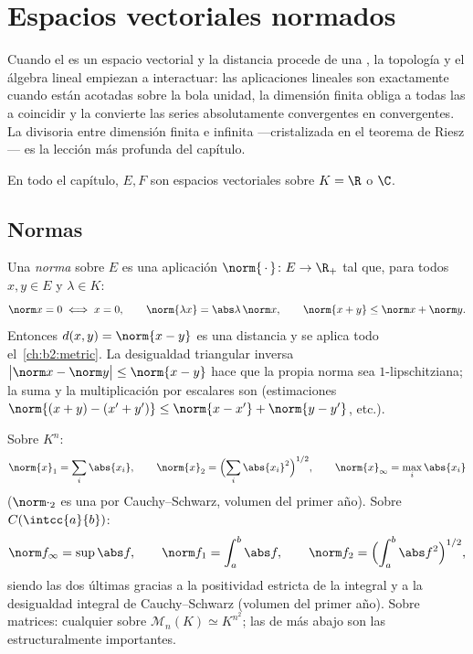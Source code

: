 \chapter{Espacios vectoriales normados}\label{ch:b2:nvs}

Cuando el  es un espacio vectorial y la distancia
procede de una , la topología y el álgebra lineal empiezan a
interactuar: las aplicaciones lineales son  exactamente
cuando están acotadas sobre la bola unidad, la dimensión finita obliga
a todas las  a coincidir y la  convierte las series
absolutamente convergentes en convergentes. La divisoria entre
dimensión finita e infinita ---cristalizada en el teorema de Riesz---
es la lección más profunda del capítulo.

En todo el capítulo, $E, F$ son espacios vectoriales sobre $K = \R$ o
$\C$.

\section{Normas}

\begin{definition}\label{def:b2:nvs:norm}
Una \emph{norma} sobre $E$ es una aplicación
$\norm{\,\cdot\,} \colon E \to \R_+$ tal que, para todos $x, y \in
E$ y $\lambda \in K$:
\[
\norm x = 0 \iff x = 0,
\qquad
\norm{\lambda x} = \abs\lambda\,\norm x,
\qquad
\norm{x + y} \leq \norm x + \norm y .
\]
Entonces $d(x, y) = \norm{x - y}$ es una distancia y se aplica todo
el~\cref{ch:b2:metric}. La desigualdad triangular inversa
$\bigl|\norm x - \norm y\bigr| \leq \norm{x - y}$ hace que la propia
norma sea $1$-lipschitziana; la suma y la multiplicación por
escalares son  (estimaciones $\norm{(x + y) - (x' + y')}
\leq \norm{x - x'} + \norm{y - y'}$, etc.).
\end{definition}

\begin{example}\label{ex:b2:nvs:examples}
Sobre $K^n$:
\[
\norm{x}_1 = \sum_i \abs{x_i},
\qquad
\norm{x}_2 = \Bigl(\sum_i \abs{x_i}^2\Bigr)^{1/2},
\qquad
\norm{x}_\infty = \max_i \abs{x_i}
\]
($\norm\cdot_2$ es una  por Cauchy--Schwarz, volumen del primer
año). Sobre $C(\intcc{a}{b})$:
\[
\norm f_\infty = \sup \abs f,
\qquad
\norm f_1 = \int_a^b \abs f,
\qquad
\norm f_2 = \Bigl(\int_a^b \abs f^2\Bigr)^{1/2},
\]
siendo las dos últimas  gracias a la positividad estricta de
la integral y a la desigualdad integral de Cauchy--Schwarz (volumen
del primer año). Sobre matrices: cualquier  sobre
$\mathcal M_n(K) \simeq K^{n^2}$; las  de más
abajo son las estructuralmente importantes.
\end{example}


